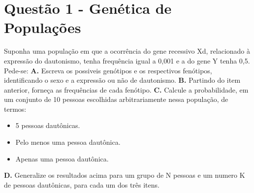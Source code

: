 \documentclass[a4paper, 12pt]{article}
\begin{document}
\section*{Questão 1 - Genética de Populações}
\large {Suponha uma população em que a ocorrência do gene recessivo Xd, relacionado à expressão do dautonismo, tenha frequência igual a 0,001 e a do gene Y tenha 0,5. Pede-se:}
\newline
\newline
\textbf{A.} Escreva os possiveis genótipos e os respectivos fenótipos, identificando o sexo e a expressão ou não de dautonismo.
\newline
\newline
\textbf{B.} Partindo do item anterior, forneça as frequências de cada fenótipo.
\newline
\newline
\textbf{C.}  Calcule a probabilidade, em um conjunto de 10 pessoas escolhidas arbitrariamente nessa população, de termos:
\begin{itemize}
\item{5 pessoas dautônicas.}
\item{Pelo menos uma pessoa dautônica.}
\item{Apenas uma pessoa dautônica.}
\end{itemize}
\vspace{4mm}
\textbf{D.} Generalize os resultados acima para um grupo de N pessoas e um numero K de pessoas dautônicas, para cada um dos três itens.
\end{document}
